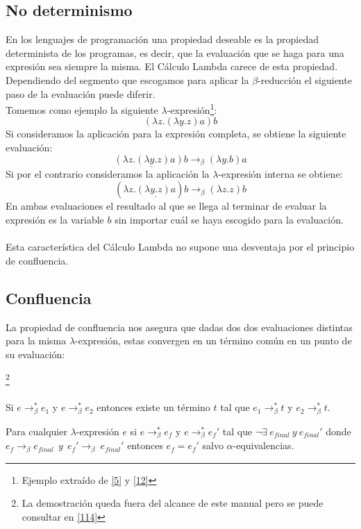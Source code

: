                 \subsection{No determinismo}
                    En los lenguajes de programación una propiedad deseable es la propiedad determinista de los programas, es decir, que la evaluación que se haga para una expresión sea siempre la misma. El Cálculo Lambda carece de esta propiedad. Dependiendo del segmento que escogamos para aplicar la $\beta$-reducción el siguiente paso de la evaluación puede diferir.\\
		   Tomemos como ejemplo la siguiente $\lambda$-expresión\footnote{Ejemplo extraído de \hyperlink{5}{[5]} y  \hyperlink{12}{[12]} }:
                    $$(\lambda z.(\lambda y.z)a)b$$
                    Si consideramos la aplicación para la expresión completa, se obtiene la siguiente evaluación: $$\underline{(\lambda z.(\lambda y.z)a)b} \rightarrow_\beta (\lambda y.b)a$$
                    Si por el contrario consideramos la aplicación la $\lambda$-expresión interna se obtiene: $$(\lambda z.\underline{(\lambda y.z)a})b \rightarrow_\beta (\lambda z.z)b$$
                    En ambas evaluaciones el resultado al que se llega al terminar de evaluar la expresión es la variable $b$ sin importar cuál se haya escogido para la evaluación.\\\\
                    Esta característica del Cálculo Lambda no supone una desventaja por el principio de confluencia.

                \subsection{Confluencia}
                    La propiedad de confluencia nos asegura que dadas dos dos evaluaciones distintas para la misma $\lambda$-expresión, estas convergen en un término común en un punto de su evaluación:

                    \begin{theorem}\footnote{La demostración queda fuera del alcance de este manual pero se puede consultar en \hyperlink{114}{[114]}}\\\\
 Si $e\to_\beta^* e_1$ y $e\to_\beta^*e_2$ entonces existe un término $t$ tal que  $e_1\to_\beta^* t$ y $e_2\to_\beta^* t$.
                    \end{theorem}

                    \begin{corollary}
Para cualquier $\lambda$-expresión $e$ si $e\to_\beta^*e_f$ y $e\to_\beta^*e_f'$ tal que  $\neg \exists\ e_{final}\ y\ e_{final}'$ donde $e_f \rightarrow_{\beta} e_{final}\ \ y\ \ e_f' \rightarrow_{\beta}\ e_{final}'$
entonces $e_f = e_f'$ salvo $\alpha$-equivalencias. 
                    \end{corollary}


